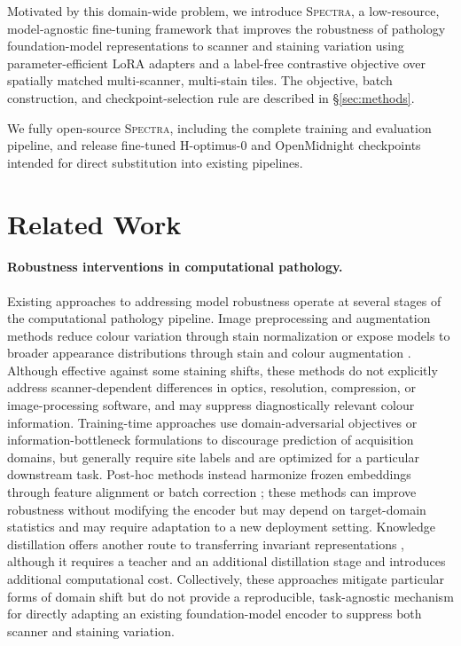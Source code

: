 \documentclass{article}
\begin{document}
Motivated by this domain-wide problem, we introduce \textsc{Spectra}, a low-resource, model-agnostic fine-tuning framework that improves the robustness of pathology foundation-model representations to scanner and staining variation using parameter-efficient LoRA adapters and a label-free contrastive objective over spatially matched multi-scanner, multi-stain tiles. The objective, batch construction, and checkpoint-selection rule are described in \S\ref{sec:methods}.

We fully open-source \textsc{Spectra}, including the complete training and evaluation pipeline, and release fine-tuned H-optimus-0 and OpenMidnight checkpoints intended for direct substitution into existing pipelines.

\section{Related Work}
\label{sec:related_work}

\paragraph{Robustness interventions in computational pathology.}
Existing approaches to addressing model robustness operate at several stages of the computational pathology pipeline. Image preprocessing and augmentation methods reduce colour variation through stain normalization \citep{reinhard2001,macenko2009,vahadane2016structure} or expose models to broader appearance distributions through stain and colour augmentation \citep{tellez2019quantifying,shen2022randstainna}. Although effective against some staining shifts, these methods do not explicitly address scanner-dependent differences in optics, resolution, compression, or image-processing software, and may suppress diagnostically relevant colour information. Training-time approaches use domain-adversarial objectives \citep{ganin2016dann} or information-bottleneck formulations \citep{huang2025flex} to discourage prediction of acquisition domains, but generally require site labels and are optimized for a particular downstream task. Post-hoc methods instead harmonize frozen embeddings through feature alignment or batch correction \citep{nguyen2026fmmap,koemen2026pathorob}; these methods can improve robustness without modifying the encoder but may depend on target-domain statistics and may require adaptation to a new deployment setting. Knowledge distillation offers another route to transferring invariant representations \citep{filiot2025distill}, although it requires a teacher and an additional distillation stage and introduces additional computational cost. Collectively, these approaches mitigate particular forms of domain shift but do not provide a reproducible, task-agnostic mechanism for directly adapting an existing foundation-model encoder to suppress both scanner and staining variation.
\end{document}
